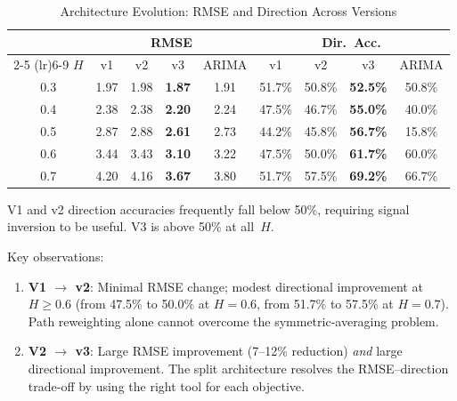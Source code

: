 \documentclass[12pt,a4paper]{article}
\begin{document}
\begin{table}[htbp]
  \centering
  \caption{Architecture Evolution: RMSE and Direction Across Versions}
  \label{tab:evolution}
  \begin{threeparttable}
  \begin{tabular}{c cccc cccc}
    \toprule
    & \multicolumn{4}{c}{\textbf{RMSE}} &
      \multicolumn{4}{c}{\textbf{Dir.\ Acc.}} \\
    \cmidrule(lr){2-5} \cmidrule(lr){6-9}
    $H$ & v1 & v2 & v3 & ARIMA & v1 & v2 & v3 & ARIMA \\
    \midrule
    0.3 & 1.97 & 1.98 & \textbf{1.87} & 1.91
        & 51.7\% & 50.8\% & \textbf{52.5\%} & 50.8\% \\
    0.4 & 2.38 & 2.38 & \textbf{2.20} & 2.24
        & 47.5\% & 46.7\% & \textbf{55.0\%} & 40.0\% \\
    0.5 & 2.87 & 2.88 & \textbf{2.61} & 2.73
        & 44.2\% & 45.8\% & \textbf{56.7\%} & 15.8\% \\
    0.6 & 3.44 & 3.43 & \textbf{3.10} & 3.22
        & 47.5\% & 50.0\% & \textbf{61.7\%} & 60.0\% \\
    0.7 & 4.20 & 4.16 & \textbf{3.67} & 3.80
        & 51.7\% & 57.5\% & \textbf{69.2\%} & 66.7\% \\
    \bottomrule
  \end{tabular}
  \begin{tablenotes}\small
    \item V1 and v2 direction accuracies frequently fall below 50\%,
          requiring signal inversion to be useful.  V3 is above 50\% at
          all~$H$.
  \end{tablenotes}
  \end{threeparttable}
\end{table}

Key observations:
\begin{enumerate}
  \item \textbf{V1 $\to$ v2}: Minimal RMSE change; modest directional
        improvement at $H \geq 0.6$ (from 47.5\% to 50.0\% at $H = 0.6$,
        from 51.7\% to 57.5\% at $H = 0.7$).  Path reweighting alone
        cannot overcome the symmetric-averaging problem.
  \item \textbf{V2 $\to$ v3}: Large RMSE improvement (7--12\% reduction)
        \emph{and} large directional improvement.  The split architecture
        resolves the RMSE--direction trade-off by using the right tool for
        each objective.
\end{enumerate}
\end{document}
